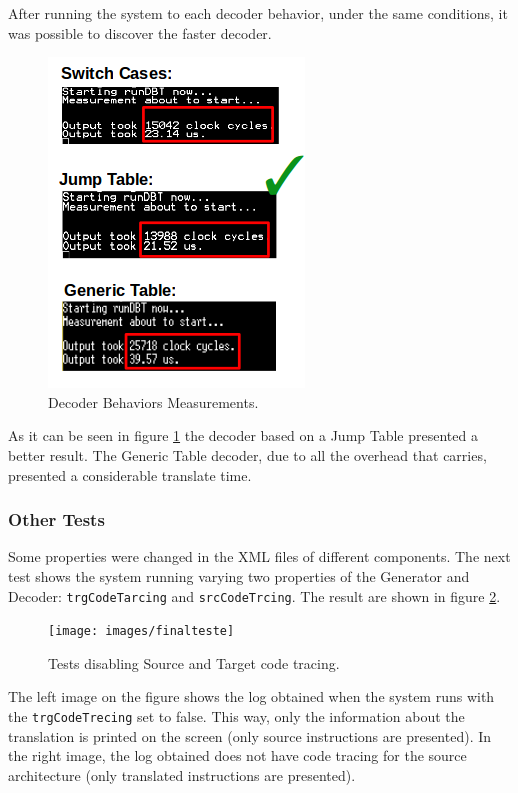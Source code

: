 After running the system to each decoder behavior, under the same conditions, it was possible to discover the faster decoder.

\begin{figure}[H]
\centerline{
\includegraphics[scale=0.67]{images/DecoderBehaviorsResults}
}
\caption{Decoder Behaviors Measurements.}
\label{fig:DecoderBehaviorsMeasurements}
\end{figure}

As it can be seen in figure \ref{fig:DecoderBehaviorsMeasurements} the decoder based on a Jump Table presented a better result. The Generic Table decoder, due to all the overhead that carries, presented a considerable translate time.

\subsubsection{Other Tests}
Some properties were changed in the XML files of different components. The next test shows the system running varying two properties of the Generator and Decoder: \texttt{trgCodeTarcing} and \texttt{srcCodeTrcing}. The result are shown in figure \ref{fig:finalteste}.

\begin{figure}[H]
\centerline{
\texttt{[image: images/finalteste]}
}
\caption{Tests disabling Source and Target code tracing.}
\label{fig:finalteste}
\end{figure}


The left image on the figure shows the log obtained when the system runs with the \texttt{trgCodeTrecing} set to false. This way, only the information about the translation is printed on the screen (only source instructions are presented). In the right image, the log obtained does not have code tracing for the source architecture (only translated instructions are presented). \\

